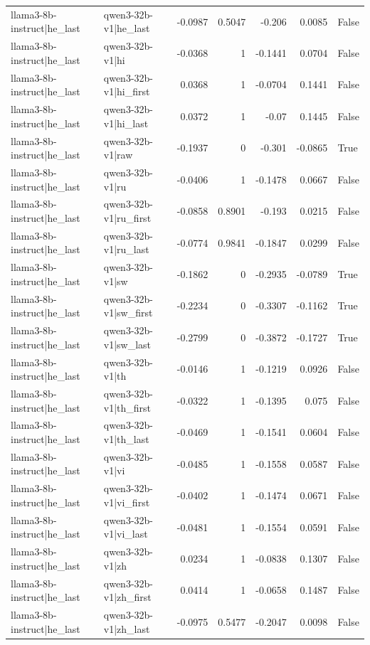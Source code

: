 \begin{table}
\begin{tabular}{l l r r r r l}
llama3-8b-instruct|he_last & qwen3-32b-v1|he_last & -0.0987 & 0.5047 & -0.206 & 0.0085 & False \\
llama3-8b-instruct|he_last & qwen3-32b-v1|hi & -0.0368 & 1 & -0.1441 & 0.0704 & False \\
llama3-8b-instruct|he_last & qwen3-32b-v1|hi_first & 0.0368 & 1 & -0.0704 & 0.1441 & False \\
llama3-8b-instruct|he_last & qwen3-32b-v1|hi_last & 0.0372 & 1 & -0.07 & 0.1445 & False \\
llama3-8b-instruct|he_last & qwen3-32b-v1|raw & -0.1937 & 0 & -0.301 & -0.0865 & True \\
llama3-8b-instruct|he_last & qwen3-32b-v1|ru & -0.0406 & 1 & -0.1478 & 0.0667 & False \\
llama3-8b-instruct|he_last & qwen3-32b-v1|ru_first & -0.0858 & 0.8901 & -0.193 & 0.0215 & False \\
llama3-8b-instruct|he_last & qwen3-32b-v1|ru_last & -0.0774 & 0.9841 & -0.1847 & 0.0299 & False \\
llama3-8b-instruct|he_last & qwen3-32b-v1|sw & -0.1862 & 0 & -0.2935 & -0.0789 & True \\
llama3-8b-instruct|he_last & qwen3-32b-v1|sw_first & -0.2234 & 0 & -0.3307 & -0.1162 & True \\
llama3-8b-instruct|he_last & qwen3-32b-v1|sw_last & -0.2799 & 0 & -0.3872 & -0.1727 & True \\
llama3-8b-instruct|he_last & qwen3-32b-v1|th & -0.0146 & 1 & -0.1219 & 0.0926 & False \\
llama3-8b-instruct|he_last & qwen3-32b-v1|th_first & -0.0322 & 1 & -0.1395 & 0.075 & False \\
llama3-8b-instruct|he_last & qwen3-32b-v1|th_last & -0.0469 & 1 & -0.1541 & 0.0604 & False \\
llama3-8b-instruct|he_last & qwen3-32b-v1|vi & -0.0485 & 1 & -0.1558 & 0.0587 & False \\
llama3-8b-instruct|he_last & qwen3-32b-v1|vi_first & -0.0402 & 1 & -0.1474 & 0.0671 & False \\
llama3-8b-instruct|he_last & qwen3-32b-v1|vi_last & -0.0481 & 1 & -0.1554 & 0.0591 & False \\
llama3-8b-instruct|he_last & qwen3-32b-v1|zh & 0.0234 & 1 & -0.0838 & 0.1307 & False \\
llama3-8b-instruct|he_last & qwen3-32b-v1|zh_first & 0.0414 & 1 & -0.0658 & 0.1487 & False \\
llama3-8b-instruct|he_last & qwen3-32b-v1|zh_last & -0.0975 & 0.5477 & -0.2047 & 0.0098 & False \\

\end{tabular}
\end{table}
